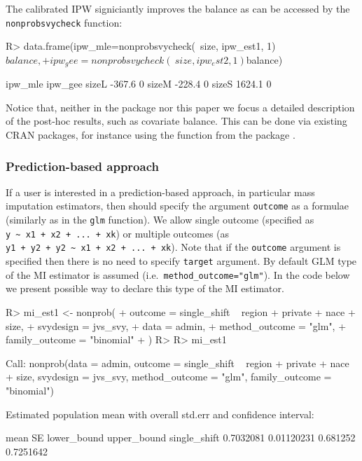 \documentclass[
]{jss}
\begin{document}
The calibrated IPW signiciantly improves the balance as can be accessed
by the \texttt{nonprobsvycheck} function:

\begin{CodeChunk}
\begin{CodeInput}
R> data.frame(ipw_mle=nonprobsvycheck(~size, ipw_est1, 1)$balance,
+            ipw_gee=nonprobsvycheck(~size, ipw_est2, 1)$balance)
\end{CodeInput}
\begin{CodeOutput}
      ipw_mle ipw_gee
sizeL  -367.6       0
sizeM  -228.4       0
sizeS  1624.1       0
\end{CodeOutput}
\end{CodeChunk}

Notice that, neither in the package nor this paper we focus a detailed
description of the post-hoc results, such as covariate balance. This can
be done via existing CRAN packages, for instance using the
 function from the  package \citep{cobalt}.

\subsubsection{Prediction-based
approach}\label{prediction-based-approach}

If a user is interested in a prediction-based approach, in particular
mass imputation estimators, then should specify the argument
\texttt{outcome} as a formulae (similarly as in the \texttt{glm}
function). We allow single outcome (specified as
\texttt{y\ \textasciitilde{}\ x1\ +\ x2\ +\ ...\ +\ xk}) or multiple
outcomes (as
\texttt{y1\ +\ y2\ +\ y2\ \textasciitilde{}\ x1\ +\ x2\ +\ ...\ +\ xk}).
Note that if the \texttt{outcome} argument is specified then there is no
need to specify \texttt{target} argument. By default GLM type of the MI
estimator is assumed (i.e.~\texttt{method\_outcome="glm"}). In the code
below we present possible way to declare this type of the MI estimator.

\begin{CodeChunk}
\begin{CodeInput}
R> mi_est1 <- nonprob(
+   outcome = single_shift ~ region + private + nace + size,
+   svydesign = jvs_svy,
+   data = admin,
+   method_outcome = "glm",
+   family_outcome = "binomial"
+ )
R> 
R> mi_est1
\end{CodeInput}
\begin{CodeOutput}

Call:
nonprob(data = admin, outcome = single_shift ~ region + private + 
    nace + size, svydesign = jvs_svy, method_outcome = "glm", 
    family_outcome = "binomial")

Estimated population mean with overall std.err and confidence interval:

                  mean         SE lower_bound upper_bound
single_shift 0.7032081 0.01120231    0.681252   0.7251642
\end{CodeOutput}
\end{CodeChunk}
\end{document}
